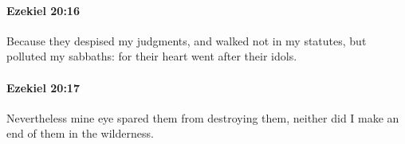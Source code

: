		\paragraph{Ezekiel 20:16} %
			\label{EZEKIEL-20-16}

			Because they despised my judgments, and walked not in my statutes, but polluted my sabbaths: for their heart went after their idols.


		\paragraph{Ezekiel 20:17} %
			\label{EZEKIEL-20-17}

			Nevertheless mine eye spared them from destroying them, neither did I make an end of them in the wilderness.


